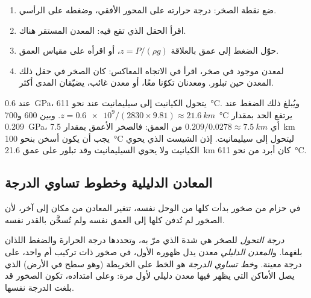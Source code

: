 \begin{method}\label{met:g12:metamorphic-rocks:pt}
\begin{enumerate}
  \item ضع نقطة الصخر: درجة حرارته على المحور
        الأفقي، وضغطه على الرأسي.
  \item اقرأ الحقل الذي تقع فيه: المعدن المستقر هناك.
  \item حوّل الضغط إلى عمق بالعلاقة $z = P/(\rho g)$، أو اقرأه على
        مقياس العمق.
  \item لمعدن موجود في صخر، اقرأ في الاتجاه المعاكس: كان الصخر في
        حقل ذلك المعدن حين تبلور. ومعدنان تكوّنا
        معًا، أو معدن غائب، يضيّقان المدى أكثر.
\end{enumerate}
\end{method}

\begin{example}\label{ex:g12:metamorphic-rocks:kysil}
عند \qty{0.6}{GPa}، يتحول الكيانيت إلى سيليمانيت عند نحو
\qty{611}{\celsius}. ويُبلغ ذلك الضغط عند $z = \num{0.6e9} / (2830
\times 9.81) \approx \qty{21.6}{km}$. وبين 600 و\qty{700}{\celsius}
يرتفع الحد بمقدار \qty{0.209}{GPa}، أي $0.209/0.0278 \approx
\qty{7.5}{km}$ من العمق: فالصخر الأعمق بمقدار \qty{7.5}{km} يجب أن يكون أسخن بنحو
\qty{100}{\celsius} ليتحول إلى سيليمانيت. إذن الشيست الذي يحوي
الكيانيت ولا يحوي السيليمانيت وقد تبلور على عمق \qty{21.6}{km} كان
أبرد من نحو \qty{611}{\celsius}.
\end{example}

\subsection{المعادن الدليلية وخطوط تساوي الدرجة}

في حزام من صخور بدأت كلها من الوحل نفسه، تتغير المعادن
من مكان إلى آخر، لأن الصخور لم تُدفن كلها إلى العمق نفسه ولم تُسخَّن
بالقدر نفسه.

\begin{definition}\label{def:g12:metamorphic-rocks:index-mineral}
\emph{درجة التحول} للصخر هي
شدة  الذي مرّ به، وتحددها درجة الحرارة
والضغط اللذان بلغهما. و\emph{المعدن الدليلي}
معدن يدل ظهوره الأول، في صخور ذات تركيب أم واحد،
على درجة معينة. و\emph{خط تساوي الدرجة} هو الخط على الخريطة
(وهو سطح في الأرض) الذي يصل الأماكن التي يظهر فيها معدن دليلي لأول
مرة: وعلى امتداده، تكون الصخور قد بلغت الدرجة نفسها.
\end{definition}

